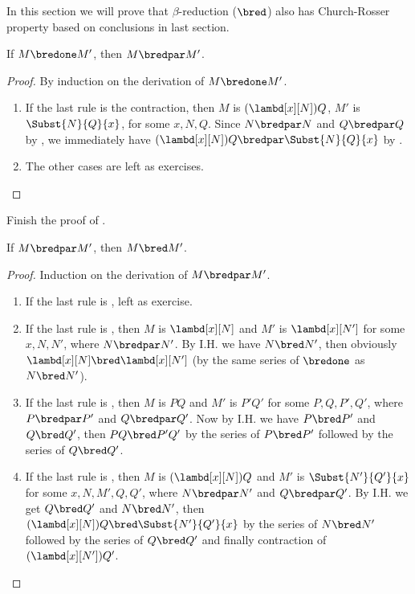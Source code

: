 \documentclass[../../../include/open-logic-section]{subfiles}
\begin{document}


In this section we will prove that $\beta$-reduction ($\bred$) also has
Church-Rosser property based on conclusions in last section.

\begin{lem}
  If $M \bredone M'$, then $M \bredpar M'$.
\end{lem}
\begin{proof} By induction on the derivation of $M \bredone M'$.
  \begin{enumerate}
  \item If the last rule is the contraction, then $M$ is
    $(\lambd[x][N])Q$, $M'$ is $\Subst{N}{Q}{x}$, for some
    $x, N, Q$. Since $N \bredpar N$ and $Q \bredpar Q$ by
    , we immediately have $(\lambd[x][N])Q
    \bredpar \Subst{N}{Q}{x}$ by .
  \item The other cases are left as exercises. 
  \end{enumerate}
\end{proof}

\begin{prob}
  Finish the proof of .
\end{prob}

\begin{lem}
  If $M \bredpar M'$, then $M \bred M'$.
\end{lem}
\begin{proof} Induction on the derivation of $M \bredpar M'$.
  \begin{enumerate}
  \item If the last rule is , left as exercise. 
  \item If the last rule is , then $M$ is 
    $\lambd[x][N]$ and $M'$ is $\lambd[x][N']$ for some $x, N, N'$, where
    $N \bredpar N'$. By I.H. we have $N \bred N'$, then obviously
    $\lambd[x][N] \bred \lambd[x][N']$ (by the same series of
    $\bredone$ as $N \bred N'$).
  \item If the last rule is , then $M$ is 
    $PQ$ and $M'$ is $P'Q'$ for some $P, Q, P', Q'$, where $P \bredpar P'$
    and $Q \bredpar Q'$. Now by I.H. we have $P \bred P'$ and $Q \bred
    Q'$, then $PQ \bred P'Q'$ by the series of $P \bred P'$ followed
    by the series of $Q \bred Q'$.
  \item If the last rule is , then $M$ is
    $(\lambd[x][N])Q$ and $M'$ is  $\Subst{N'}{Q'}{x}$ for some
    $x, N, M', Q, Q'$, where $N \bredpar N'$ and $Q \bredpar Q'$. By I.H. we get $Q \bred
    Q'$ and $N \bred N'$, then $(\lambd[x][N])Q \bred
    \Subst{N'}{Q'}{x}$ by the series of $N \bred N'$ followed by the
    series of $Q \bred Q'$ and finally contraction of
    $(\lambd[x][N'])Q'$.
  \end{enumerate}
\end{proof}
\end{document}
